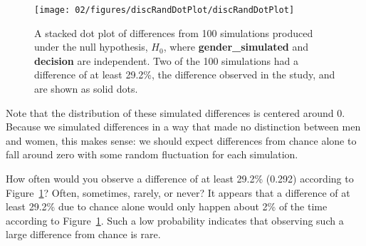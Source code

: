 \begin{figure}[ht]
\centering
\texttt{[image: 02/figures/discRandDotPlot/discRandDotPlot]}
\caption{A stacked dot plot of differences from 100 simulations produced under the null hypothesis, $H_0$, where \textbf{gender\_\hspace{0.3mm}simulated} and \textbf{decision} are independent. Two of the 100 simulations had a difference of at least 29.2\%, the difference observed in the study, and are shown as solid dots.}
\label{discRandDotPlot}
\end{figure}

Note that the distribution of these simulated differences is centered around 0. Because we simulated differences in a way that made no distinction between men and women, this makes sense: we should expect differences from chance alone to fall around zero with some random fluctuation for each simulation.

\begin{example}{How often would you observe a difference of at least 29.2\% (0.292) according to Figure~\ref{discRandDotPlot}? Often, sometimes, rarely, or never?}
It appears that a difference of at least 29.2\% due to chance alone would only happen about 2\% of the time according to Figure~\ref{discRandDotPlot}. Such a low probability indicates that observing such a large difference from chance is rare.
\end{example}

